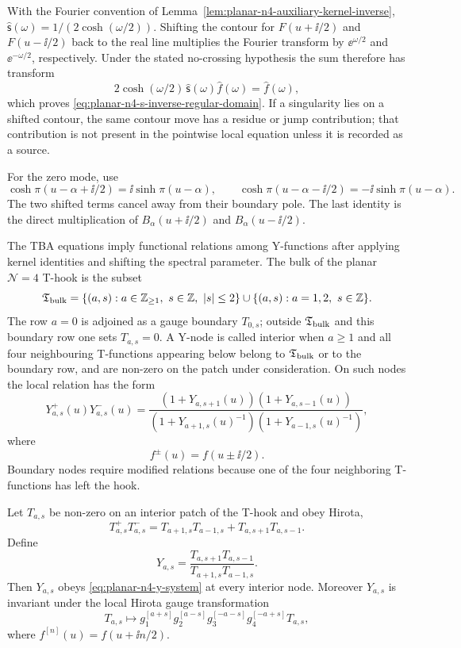 With the Fourier convention of
Lemma~\ref{lem:planar-n4-auxiliary-kernel-inverse},
\(\widehat{\mathsf s}(\omega)=1/(2\cosh(\omega/2))\).  Shifting the contour
for \(F(u+\ii/2)\) and \(F(u-\ii/2)\) back to the real line multiplies the
Fourier transform by \(\ee^{\omega/2}\) and \(\ee^{-\omega/2}\), respectively.
Under the stated no-crossing hypothesis the sum therefore has transform
\[
  2\cosh(\omega/2)\,\widehat{\mathsf s}(\omega)\widehat f(\omega)
  =
  \widehat f(\omega),
\]
which proves \eqref{eq:planar-n4-s-inverse-regular-domain}.  If a singularity
lies on a shifted contour, the same contour move has a residue or jump
contribution; that contribution is not present in the pointwise local
equation unless it is recorded as a source.

For the zero mode, use
\[
  \cosh\pi(u-\alpha+\ii/2)=\ii\sinh\pi(u-\alpha),
  \qquad
  \cosh\pi(u-\alpha-\ii/2)=-\ii\sinh\pi(u-\alpha).
\]
The two shifted terms cancel away from their boundary pole.  The last identity
is the direct multiplication of \(B_\alpha(u+\ii/2)\) and
\(B_\alpha(u-\ii/2)\).

The TBA equations imply functional relations among Y-functions after applying
kernel identities and shifting the spectral parameter.  The bulk of the
planar \(\mathcal N=4\) T-hook is the subset
\[
  \mathfrak T_{\rm bulk}
  =
  \{(a,s): a\in\mathbb Z_{\ge1},\ s\in\mathbb Z,\ |s|\le2\}
  \cup
  \{(a,s): a=1,2,\ s\in\mathbb Z\}.
\]
The row \(a=0\) is adjoined as a gauge boundary \(T_{0,s}\); outside
\(\mathfrak T_{\rm bulk}\) and this boundary row one sets \(T_{a,s}=0\).  A
Y-node is called interior when \(a\geq1\) and all four neighbouring
T-functions appearing below belong to \(\mathfrak T_{\rm bulk}\) or to the
boundary row, and are non-zero on the patch under consideration.  On such
nodes the local relation has the form
\begin{equation}
  Y_{a,s}^+(u)Y_{a,s}^-(u)
  =
  \frac{(1+Y_{a,s+1}(u))(1+Y_{a,s-1}(u))}
       {(1+Y_{a+1,s}(u)^{-1})(1+Y_{a-1,s}(u)^{-1})},
  \label{eq:planar-n4-y-system}
\end{equation}
where
\[
  f^\pm(u)=f(u\pm\ii/2).
\]
Boundary nodes require modified relations because one of the four neighboring
T-functions has left the hook.

\begin{proposition}
\label{prop:planar-n4-hirota-origin-y-system}
Let \(T_{a,s}\) be non-zero on an interior patch of the T-hook and obey
Hirota,
\[
  T_{a,s}^+T_{a,s}^-
  =
  T_{a+1,s}T_{a-1,s}+T_{a,s+1}T_{a,s-1}.
\]
Define
\[
  Y_{a,s}
  =
  \frac{T_{a,s+1}T_{a,s-1}}{T_{a+1,s}T_{a-1,s}} .
\]
Then \(Y_{a,s}\) obeys
\eqref{eq:planar-n4-y-system} at every interior node.  Moreover \(Y_{a,s}\)
is invariant under the local Hirota gauge transformation
\begin{equation}
  T_{a,s}\mapsto
  g_1^{[a+s]}g_2^{[a-s]}g_3^{[-a-s]}g_4^{[-a+s]}T_{a,s},
  \label{eq:planar-n4-t-gauge-redundancy}
\end{equation}
where \(f^{[n]}(u)=f(u+\ii n/2)\).
\end{proposition}

